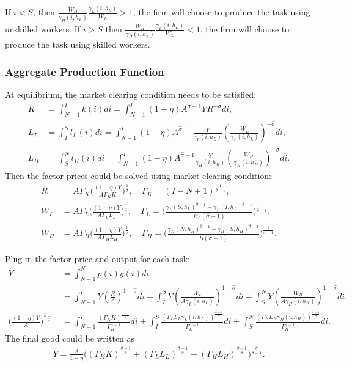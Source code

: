 \documentclass[12pt]{article}
\begin{document}
\begin{appendices}
If $i<S$, then $\frac{W_H}{\gamma_H(i,h_L)}\frac{\gamma_L(i,h_L)}{W_L}>1$, the firm will choose to produce the task using unskilled workers. If $i>S$ then $\frac{W_H}{\gamma_H(i,h_L)}\frac{\gamma_L(i,h_L)}{W_L}<1$, the firm will choose to produce the task using skilled workers.

\subsubsection*{Aggregate Production Function}
At equilibrium, the market clearing condition needs to be satisfied:
\begin{align*}
K &= \int_{N-1}^I k(i)di=  \int_{N-1}^I(1-\eta)A^{\hat{\sigma}-1}YR^{-\hat{\sigma}}di, \\
L_L &= \int_{I}^S l_L(i)di=  \int_{N-1}^I (1-\eta)A^{\hat{\sigma}-1}\frac{Y}{\gamma_L(i,h_L)}(\frac{W_L}{\gamma_L(i,h_L)})^{-\hat{\sigma}}di, \\
L_H &=\int_{S}^N l_H(i)di=  \int_{N-1}^I (1-\eta)A^{\hat{\sigma}-1}\frac{Y}{\gamma_H(i,h_H)}(\frac{W_H}{\gamma_H(i,h_H)})^{-\hat{\sigma}} di.
\end{align*}
Then the factor prices could be solved using market clearing condition: 
\begin{align*}
R &=A\Gamma_K \Big(\frac{(1-\eta)Y}{A\Gamma_K K}\Big)^{\frac{1}{\hat{\sigma}}}, \quad \Gamma_K= (I-N+1)^{\frac{1}{\hat{\sigma}-1}},  \\
W_L &= A\Gamma_L\Big(\frac{(1-\eta)Y}{A\Gamma_LL_L}\Big)^{\frac{1}{\hat{\sigma}}}, \quad \Gamma_L=\Big(\frac{\gamma_L(S,h_L)^{\hat{\sigma}-1}-\gamma_L(I,h_L)^{\hat{\sigma}-1}}{B_L(\hat{\sigma}-1)}\Big)^{\frac{1}{\hat{\sigma}-1}}, \\
W_H &=A\Gamma_H\Big(\frac{(1-\eta)Y}{A\Gamma_HL_H}\Big)^{\frac{1}{\hat{\sigma}}}, \quad \Gamma_H = \Big(\frac{\gamma_H(N,h_H)^{\hat{\sigma}-1}-\gamma_H(S,h_H)^{\hat{\sigma}-1}}{B(\hat{\sigma}-1)}\Big)^{\frac{1}{\hat{\sigma}-1}}. 
\end{align*}

Plug in the factor price and output for each task:
\begin{align*}
Y &= \int_{N-1}^N p(i)y(i) di \\
	&= \int_{N-1}^I Y(\frac{R}{A})^{1-\hat{\sigma}} di + \int_I^S Y(\frac{W_L}{A\gamma_L(i,h_L)})^{1-\hat{\sigma}} di  + \int_S^N Y(\frac{W_H}{A\gamma_H(i,h_H)})^{1-\hat{\sigma}} di, \\
\Big(\frac{(1-\eta)Y}{A} \Big)^{\frac{\hat{\sigma}-1}{\hat{\sigma}}} &= \int_{N-1}^I \frac{(\Gamma_K K)^{\frac{\hat{\sigma}-1}{\hat{\sigma}}}}{\Gamma_K^{\hat{\sigma}-1}} di + \int_I^S \frac{(\Gamma_LL_L \gamma_L(i,h_L))^{\frac{\hat{\sigma}-1}{\hat{\sigma}}}}{\Gamma_L^{\hat{\sigma}-1}} di  + \int_S^N \frac{(\Gamma_HL_H \gamma_H(i,h_H))^{\frac{\hat{\sigma}-1}{\hat{\sigma}}}}{\Gamma_H^{\hat{\sigma}-1}} di.
 \end{align*}
The final good could be written as 
\begin{align*}
Y = \frac{A}{1-\eta}\Big((\Gamma_K K)^{\frac{\hat{\sigma}-1}{\hat{\sigma}}}+(\Gamma_LL_L)^{\frac{\hat{\sigma}-1}{\hat{\sigma}}}+(\Gamma_HL_H)^{\frac{\hat{\sigma}-1}{\hat{\sigma}}}\Big)^{\frac{\hat{\sigma}}{\hat{\sigma}-1}}.
 \end{align*}


\end{appendices}
\end{document}

